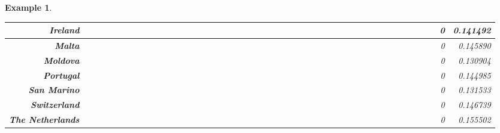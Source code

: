 \documentclass[a4paper,11pt]{report}
\newtheorem{example}[theorem]{Example}
\begin{document}
\begin{example}
\begin{appendices}
\begin{landscape}
\begin{longtable}{r|r|r|r|r|r|r|r|r|r|r|r|r|r|r|r|r|r|r|r|r|r|r|r|r|r|r|r|r|r|r|r|r|r|r|r|r|r|r|r|r|r|r|r|r|}
\multicolumn{1}{|r|}{\textbf{Ireland}}&&&&&&&&&&&&&&&&&&&&&&&&&&&&&&&&&&&&&&&&&&&0&0.141492\\ \hline
\multicolumn{1}{|r|}{\textbf{Malta}}&&&&&&&&&&&&&&&&&&&&&&&&&&&&&&&&&&&&&&&&&&&0&0.145890\\ \hline
\multicolumn{1}{|r|}{\textbf{Moldova}}&&&&&&&&&&&&&&&&&&&&&&&&&&&&&&&&&&&&&&&&&&&0&0.130904\\ \hline
\multicolumn{1}{|r|}{\textbf{Portugal}}&&&&&&&&&&&&&&&&&&&&&&&&&&&&&&&&&&&&&&&&&&&0&0.144985\\ \hline
\multicolumn{1}{|r|}{\textbf{San Marino}}&&&&&&&&&&&&&&&&&&&&&&&&&&&&&&&&&&&&&&&&&&&0&0.131533\\ \hline
\multicolumn{1}{|r|}{\textbf{Switzerland}}&&&&&&&&&&&&&&&&&&&&&&&&&&&&&&&&&&&&&&&&&&&0&0.146739\\ \hline
\multicolumn{1}{|r|}{\textbf{The Netherlands}}&&&&&&&&&&&&&&&&&&&&&&&&&&&&&&&&&&&&&&&&&&&0&0.155502 
\\ \hline
\end{longtable}

\egroup
\end{landscape}
\end{appendices}



\end{example}
\end{document}
